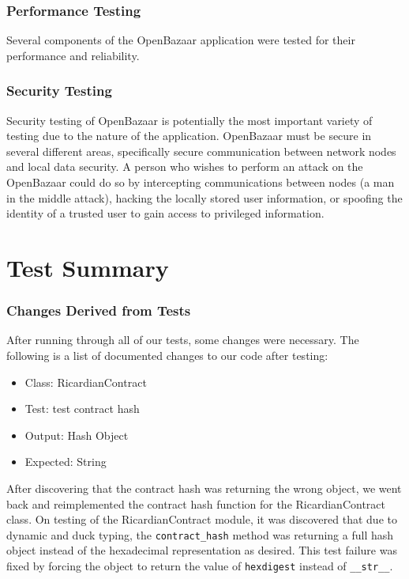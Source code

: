 \documentclass{article}
\begin{document}
\section{Performance Testing}
Several components of the OpenBazaar application were tested for their performance and reliability. 

\section{Security Testing}
Security testing of OpenBazaar is potentially the most important variety of testing due to the nature of the application. OpenBazaar must be secure in several different areas, specifically secure communication between network nodes and local data security. A person who wishes to perform an attack on the OpenBazaar could do so by intercepting communications between nodes (a man in the middle attack), hacking the locally stored user information, or spoofing the identity of a trusted user to gain access to privileged information.
\part*{Test Summary}



\section{Changes Derived from Tests}
After running through all of our tests, some changes were necessary. The following is a list of documented changes to our code after testing:
\newline
\begin{itemize}
\item Class: RicardianContract
\item Test: test contract hash
\item Output: Hash Object
\item Expected: String\newline
\end{itemize} 
After discovering that the contract hash was returning the wrong object, we went back and reimplemented the contract hash function for the RicardianContract class. On testing of the RicardianContract module, it was discovered that due to dynamic and duck typing, the \texttt{contract\_hash} method was returning a full hash object instead of the hexadecimal representation as desired. This test failure was fixed by forcing the object to return the value of \texttt{hexdigest} instead of \texttt{\_\_str\_\_}.



\end{document}

